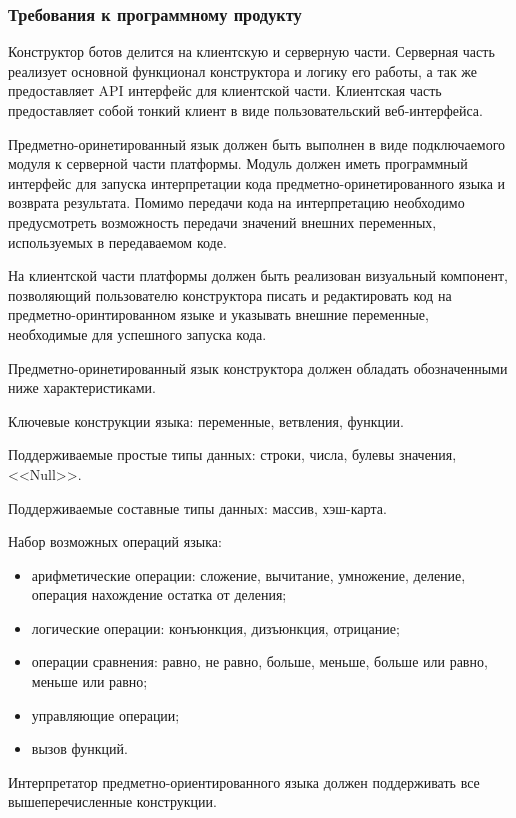 \subsubsection{Требования к программному продукту}

Конструктор ботов делится на клиентскую и серверную части.
Серверная часть реализует основной функционал конструктора и логику его работы,
а так же предоставляет API интерфейс для клиентской части.
Клиентская часть предоставляет собой тонкий клиент в виде пользовательский веб-интерфейса.

Предметно-оринетированный язык должен быть выполнен в виде подключаемого модуля к серверной части платформы.
Модуль должен иметь программный интерфейс для запуска интерпретации кода предметно-оринетированного языка и возврата результата.
Помимо передачи кода на интерпретацию необходимо предусмотреть возможность передачи значений внешних переменных, используемых в передаваемом коде.

На клиентской части платформы должен быть реализован визуальный компонент,
позволяющий пользователю конструктора писать и редактировать код на предметно-оринтированном языке
и указывать внешние переменные, необходимые для успешного запуска кода.

Предметно-оринетированный язык конструктора должен обладать обозначенными ниже характеристиками.

Ключевые конструкции языка: переменные, ветвления, функции.

Поддерживаемые простые типы данных: строки, числа, булевы значения, <<Null>>.

Поддерживаемые составные типы данных: массив, хэш-карта.

Набор возможных операций языка:
\begin{itemize}
	\item арифметические операции: сложение, вычитание, умножение, деление, операция нахождение остатка от деления;
	\item логические операции: конъюнкция, дизъюнкция, отрицание;
	\item операции сравнения: равно, не равно, больше, меньше, больше или равно, меньше или равно;
	\item управляющие операции;
	\item вызов функций.
\end{itemize}

Интерпретатор предметно-ориентированного языка должен поддерживать все вышеперечисленные конструкции.


